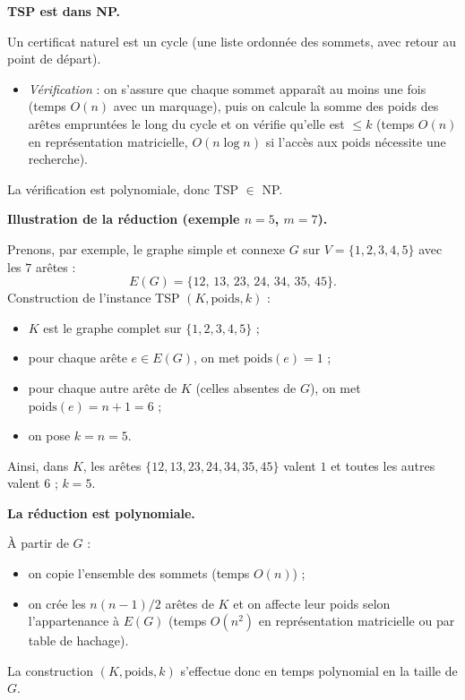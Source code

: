 \begin{corrections}
  \begin{questions}

  \item \textbf{TSP est dans NP.}
  
    Un certificat naturel est un cycle (une liste ordonnée des sommets, avec retour au point de départ).
    \begin{itemize}
      \item \emph{Vérification} : on s’assure que chaque sommet apparaît au moins une fois (temps $O(n)$ avec un marquage), puis on calcule la somme des poids des arêtes empruntées le long du cycle et on vérifie qu’elle est $\le k$ (temps $O(n)$ en représentation matricielle, $O(n \log n)$ si l’accès aux poids nécessite une recherche). 
    \end{itemize}
    La vérification est polynomiale, donc \textsc{TSP} $\in$ NP.

  \item \textbf{Illustration de la réduction (exemple $n=5$, $m=7$).}
  
    Prenons, par exemple, le graphe simple et connexe $G$ sur $V=\{1,2,3,4,5\}$ avec les $7$ arêtes :
    \[
      E(G)=\{12,\,13,\,23,\,24,\,34,\,35,\,45\}.
    \]
    Construction de l’instance \textsc{TSP} $(K,\text{poids},k)$ :
    \begin{itemize}
      \item $K$ est le graphe complet sur $\{1,2,3,4,5\}$ ;
      \item pour chaque arête $e\in E(G)$, on met $\text{poids}(e)=1$ ;
      \item pour chaque autre arête de $K$ (celles absentes de $G$), on met $\text{poids}(e)=n+1=6$ ;
      \item on pose $k=n=5$.
    \end{itemize}
    Ainsi, dans $K$, les arêtes $\{12,13,23,24,34,35,45\}$ valent $1$ et toutes les autres valent $6$ ; $k=5$.

  \item \textbf{La réduction est polynomiale.}
  
    À partir de $G$ :
    \begin{itemize}
      \item on copie l’ensemble des sommets (temps $O(n)$) ;
      \item on crée les $n(n-1)/2$ arêtes de $K$ et on affecte leur poids selon l’appartenance à $E(G)$ (temps $O(n^2)$ en représentation matricielle ou par table de hachage).
    \end{itemize}
    La construction $(K,\text{poids},k)$ s’effectue donc en temps polynomial en la taille de $G$.


\end{questions}
\end{corrections}
